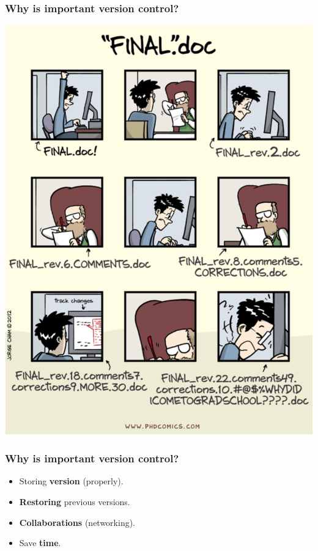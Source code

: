 \documentclass{beamer}
\begin{document}
\begin{frame}
\frametitle{Why is important version control?}
\begin{center}
\includegraphics[scale=0.29]{img/phd_comics.png}
\end{center}
\end{frame}


\begin{frame}
\frametitle{Why is important version control?}
\begin{itemize}
    \item Storing \textbf{version} (properly). \hfill \break
    \item \textbf{Restoring} previous versions. \hfill \break
    \item \textbf{Collaborations} (networking). \hfill \break
    \item Save \textbf{time}. \hfill \break
\end{itemize}
\end{frame}
\end{document}
